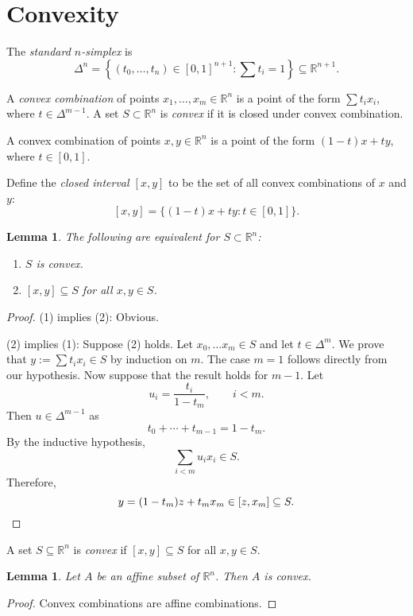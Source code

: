 \documentclass[12pt]{amsart}
\newtheorem{lemma}[theorem]{Lemma}
\theoremstyle{definition}
\theoremstyle{remark}
\numberwithin{equation}{section}
\newcommand{\RR}{\mathbb{R}}
\begin{document}
\section{Convexity}

The \emph{standard $n$-simplex} is
\[
\Delta^n = \left\{(t_0,\ldots,t_n)\in[0,1]^{n+1} : \sum t_i=1\right\}
\subseteq\RR^{n+1}.
\]

A \emph{convex combination} of points $x_1,\ldots,x_m\in\RR^n$
is a point of the form $\sum t_ix_i$, where $t\in\Delta^{m-1}$.
A set $S\subset\RR^n$ is \emph{convex} if it is closed under
convex combination.

A convex combination of points $x, y\in\RR^n$ is
a point of the form $(1-t)x + ty$, where $t\in [0,1]$.

Define the \emph{closed interval $[x, y]$} to be the set of all convex
combinations of $x$ and $y$:
\[
    [x, y] = \{(1-t)x + ty : t\in[0, 1]\}.
\]

\begin{lemma}
    The following are equivalent for $S\subset\RR^n$:
    \begin{enumerate}
        \item $S$ is convex.
        \item $[x,y]\subseteq S$ for all $x, y\in S$.
    \end{enumerate}
    
\end{lemma}

\begin{proof}
    (1) implies (2): Obvious.

    (2) implies (1): Suppose (2) holds.
    Let $x_0,\ldots x_m\in S$ and let $t\in\Delta^m$.
    We prove that $y:=\sum t_ix_i\in S$ by induction on $m$.
    The case $m=1$ follows directly from our hypothesis.
    Now suppose that the result holds for $m-1$.
    Let
    \[
        u_i = \frac{t_i}{1 - t_m},\qquad i<m.
    \]
    Then $u\in\Delta^{m-1}$ as
    \[
        t_0+\cdots+t_{m-1} = 1-t_m.
    \]
    By the inductive hypothesis,
    \[
        \sum_{i<m} u_ix_i\in S.
    \]
    Therefore, 
    \[
        y = (1-t_m)z + t_mx_m\in [z,x_m]\subseteq S.\qedhere
    \]
\end{proof}

A set $S\subseteq\RR^n$ is \emph{convex} if $[x, y]\subseteq S$ for
all $x, y\in S$.

\begin{lemma}
    Let $A$ be an affine subset of $\RR^n$.
    Then $A$ is convex.
\end{lemma}
\begin{proof}
    Convex combinations are affine combinations.
\end{proof}
\end{document}
